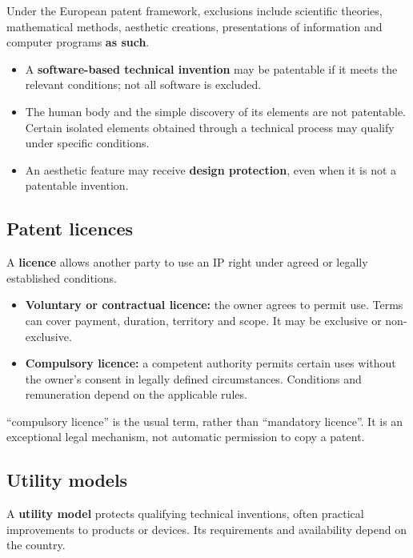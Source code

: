 \documentclass[12pt,a4paper]{report}
\newcommand{\tightlist}{}
\begin{document}
Under the European patent framework, exclusions include scientific theories, mathematical methods, aesthetic creations, presentations of information and computer programs \textbf{as such}.

\begin{itemize}
\tightlist
\item
  A \textbf{software-based technical invention} may be patentable if it meets the relevant conditions; not all software is excluded.
\item
  The human body and the simple discovery of its elements are not patentable. Certain isolated elements obtained through a technical process may qualify under specific conditions.
\item
  An aesthetic feature may receive \textbf{design protection}, even when it is not a patentable invention.
\end{itemize}

\hypertarget{patent-licences}{%
\subsection{Patent licences}\label{patent-licences}}

A \textbf{licence} allows another party to use an IP right under agreed or legally established conditions.

\begin{itemize}
\tightlist
\item
  \textbf{Voluntary or contractual licence:} the owner agrees to permit use. Terms can cover payment, duration, territory and scope. It may be exclusive or non-exclusive.
\item
  \textbf{Compulsory licence:} a competent authority permits certain uses without the owner's consent in legally defined circumstances. Conditions and remuneration depend on the applicable rules.
\end{itemize}

``compulsory licence'' is the usual term, rather than ``mandatory licence''. It is an exceptional legal mechanism, not automatic permission to copy a patent.

\hypertarget{utility-models}{%
\subsection{Utility models}\label{utility-models}}

A \textbf{utility model} protects qualifying technical inventions, often practical improvements to products or devices. Its requirements and availability depend on the country.
\end{document}
